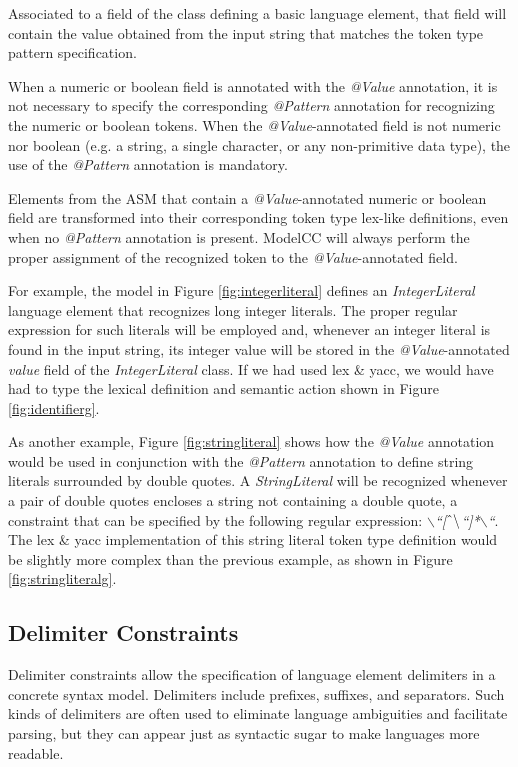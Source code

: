 \documentclass[a4paper,twoside,onecolumn]{article}
\newcommand{\an}[1]{\emph{#1}} %
\begin{document}
Associated to a field of the class defining a basic language element, that field will contain the value obtained from the input string that matches the token type pattern specification.

When a numeric or boolean field is annotated with the \an{@Value} annotation, it is not necessary to specify the corresponding \an{@Pattern} annotation for recognizing the numeric or boolean tokens. When the \an{@Value}-annotated field is not numeric nor boolean (e.g. a string, a single character, or any non-primitive data type), the use of the \an{@Pattern} annotation is mandatory.

Elements from the ASM that contain a \an{@Value}-annotated numeric or boolean field are transformed into their corresponding token type lex-like definitions, even when no \an{@Pattern} annotation is present.
ModelCC will always perform the proper assignment of the recognized token to the \an{@Value}-annotated field.

For example, the model in Figure \ref{fig:integerliteral} defines an \emph{IntegerLiteral} language element that recognizes long integer literals.
The proper regular expression for such literals will be employed and, whenever an integer literal is found in the input string, its integer value will be stored in the \an{@Value}-annotated \emph{value} field of the \emph{IntegerLiteral} class.
If we had used lex \& yacc, we would have had to type the lexical definition and semantic action shown in Figure \ref{fig:identifierg}.

As another example, Figure \ref{fig:stringliteral} shows how the \an{@Value} annotation would be used in conjunction with the \an{@Pattern} annotation to define string literals surrounded by double quotes.
A \emph{StringLiteral} will be recognized whenever a pair of double quotes encloses a string not containing a double quote, a constraint that can be specified by the following regular expression: \emph{$\backslash$``[$\mathbin{\char`\^}\backslash$``]*$\backslash$``}.
The lex \& yacc implementation of this string literal token type definition would be slightly more complex than the previous example, as shown in Figure \ref{fig:stringliteralg}.

\subsection{Delimiter Constraints} \label{subsec:delimiters}

Delimiter constraints allow the specification of language element delimiters in a concrete syntax model. Delimiters include prefixes, suffixes, and separators.
Such kinds of delimiters are often used to eliminate language ambiguities and facilitate parsing, but they can appear just as syntactic sugar to make languages more readable.
\end{document}
